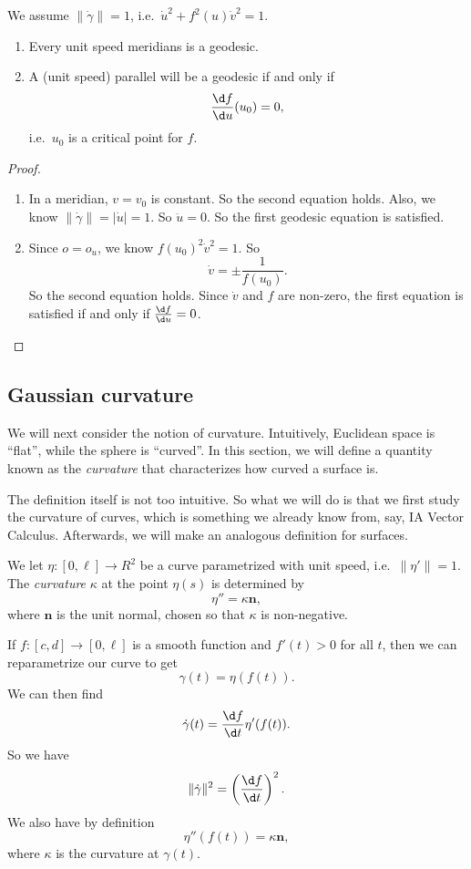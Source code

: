 \documentclass[a4paper]{article}
\begin{document}
\begin{prop}
  We assume $\|\dot{\gamma}\| = 1$, i.e.\ $\dot{u}^2 + f^2 (u) \dot{v}^2 = 1$.
  \begin{enumerate}
    \item Every unit speed meridians is a geodesic.
    \item A (unit speed) parallel will be a geodesic if and only if
      \[
        \frac{\d f}{\d u} (u_0) = 0,
      \]
      i.e.\ $u_0$ is a critical point for $f$.
  \end{enumerate}
\end{prop}

\begin{proof}\leavevmode
  \begin{enumerate}
    \item In a meridian, $v = v_0$ is constant. So the second equation holds. Also, we know $\|\dot{\gamma}\| = |\dot{u}| = 1$. So $\ddot{u} = 0$. So the first geodesic equation is satisfied.
    \item Since $o = o_u$, we know $f(u_0)^2 \dot{v}^2 = 1$. So
      \[
        \dot{v} = \pm \frac{1}{f(u_0)}.
      \]
      So the second equation holds. Since $\dot{v}$ and $f$ are non-zero, the first equation is satisfied if and only if $\frac{\d f}{\d u} = 0$.
  \end{enumerate}
\end{proof}

\subsection{Gaussian curvature}
We will next consider the notion of curvature. Intuitively, Euclidean space is ``flat'', while the sphere is ``curved''. In this section, we will define a quantity known as the \emph{curvature} that characterizes how curved a surface is.

The definition itself is not too intuitive. So what we will do is that we first study the curvature of curves, which is something we already know from, say, IA Vector Calculus. Afterwards, we will make an analogous definition for surfaces.

\begin{defi}
  We let $\eta: [0, \ell] \to R^2$ be a curve parametrized with unit speed, i.e.\ $\|\eta'\| = 1$. The \emph{curvature} $\kappa$ at the point $\eta(s)$ is determined by
  \[
    \eta'' = \kappa \mathbf{n},
  \]
  where $\mathbf{n}$ is the unit normal, chosen so that $\kappa$ is non-negative.
\end{defi}
If $f: [c, d] \to [0, \ell]$ is a smooth function and $f'(t) > 0$ for all $t$, then we can reparametrize our curve to get
\[
  \gamma(t) = \eta(f(t)).
\]
We can then find
\[
  \dot{\gamma}(t) = \frac{\d f}{\d t} \eta'(f(t)).
\]
So we have
\[
  \|\dot{\gamma}\|^2 =\left(\frac{\d f}{\d t}\right)^2.
\]
We also have by definition
\[
  \eta''(f(t)) = \kappa \mathbf{n},
\]
where $\kappa$ is the curvature at $\gamma(t)$.
\end{document}
